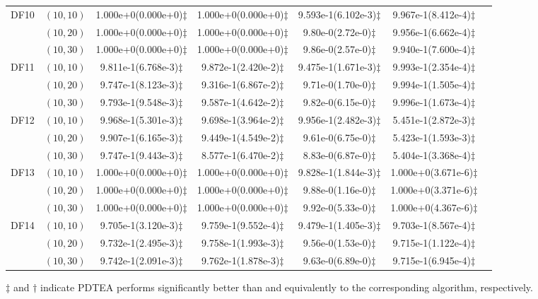 \documentclass[review]{elsarticle}
\begin{document}
\begin{table*}[!tbh]
{{\begin{tabular} {ccccccc}
\hline  \multirow{3}{*}{DF10}
&$(10,10)$ &1.000e+0(0.000e+0)$\ddagger$ &1.000e+0(0.000e+0)$\ddagger$ &9.593e-1(6.102e-3)$\ddagger$ &9.967e-1(8.412e-4)$\ddagger$ \\
&$(10,20)$ &1.000e+0(0.000e+0)$\ddagger$ &1.000e+0(0.000e+0)$\ddagger$ &9.80e-0(2.72e-0)$\ddagger$ &9.956e-1(6.662e-4)$\ddagger$ \\
&$(10,30)$ &1.000e+0(0.000e+0)$\ddagger$ &1.000e+0(0.000e+0)$\ddagger$ &9.86e-0(2.57e-0)$\ddagger$ &9.940e-1(7.600e-4)$\ddagger$ \\
\hline  \multirow{3}{*}{DF11}
&$(10,10)$ &9.811e-1(6.768e-3)$\ddagger$ &9.872e-1(2.420e-2)$\ddagger$ &9.475e-1(1.671e-3)$\ddagger$ &9.993e-1(2.354e-4)$\ddagger$ \\
&$(10,20)$ &9.747e-1(8.123e-3)$\ddagger$ &9.316e-1(6.867e-2)$\ddagger$ &9.71e-0(1.70e-0)$\ddagger$ &9.994e-1(1.505e-4)$\ddagger$ \\
&$(10,30)$ &9.793e-1(9.548e-3)$\ddagger$ &9.587e-1(4.642e-2)$\ddagger$ &9.82e-0(6.15e-0)$\ddagger$ &9.996e-1(1.673e-4)$\ddagger$ \\
\hline  \multirow{3}{*}{DF12}
&$(10,10)$ &9.968e-1(5.301e-3)$\ddagger$ &9.698e-1(3.964e-2)$\ddagger$ &9.956e-1(2.482e-3)$\ddagger$ &5.451e-1(2.872e-3)$\ddagger$ \\
&$(10,20)$ &9.907e-1(6.165e-3)$\ddagger$ &9.449e-1(4.549e-2)$\ddagger$ &9.61e-0(6.75e-0)$\ddagger$ &5.423e-1(1.593e-3)$\ddagger$ \\
&$(10,30)$ &9.747e-1(9.443e-3)$\ddagger$ &8.577e-1(6.470e-2)$\ddagger$ &8.83e-0(6.87e-0)$\ddagger$ &5.404e-1(3.368e-4)$\ddagger$ \\
\hline  \multirow{3}{*}{DF13}
&$(10,10)$ &1.000e+0(0.000e+0)$\ddagger$ &1.000e+0(0.000e+0)$\ddagger$ &9.828e-1(1.844e-3)$\ddagger$ &1.000e+0(3.671e-6)$\ddagger$ \\
&$(10,20)$ &1.000e+0(0.000e+0)$\ddagger$ &1.000e+0(0.000e+0)$\ddagger$ &9.88e-0(1.16e-0)$\ddagger$ &1.000e+0(3.371e-6)$\ddagger$ \\
&$(10,30)$ &1.000e+0(0.000e+0)$\ddagger$ &1.000e+0(0.000e+0)$\ddagger$ &9.92e-0(5.33e-0)$\ddagger$ &1.000e+0(4.367e-6)$\ddagger$ \\
\hline  \multirow{3}{*}{DF14}
&$(10,10)$ &9.705e-1(3.120e-3)$\ddagger$ &9.759e-1(9.552e-4)$\ddagger$ &9.479e-1(1.405e-3)$\ddagger$ &9.703e-1(8.567e-4)$\ddagger$ \\
&$(10,20)$ &9.732e-1(2.495e-3)$\ddagger$ &9.758e-1(1.993e-3)$\ddagger$ &9.56e-0(1.53e-0)$\ddagger$ &9.715e-1(1.122e-4)$\ddagger$ \\
&$(10,30)$ &9.742e-1(2.091e-3)$\ddagger$ &9.762e-1(1.878e-3)$\ddagger$ &9.63e-0(6.89e-0)$\ddagger$ &9.715e-1(6.945e-4)$\ddagger$ \\
\midrule
\bottomrule[1pt]
\end{tabular}}
}
\begin{tablenotes}
\item $\ddagger$ and $ \dagger$ indicate PDTEA performs significantly better than and equivalently to the corresponding algorithm, respectively.
\end{tablenotes}
\scriptsize
\end{table*}
\end{document}
